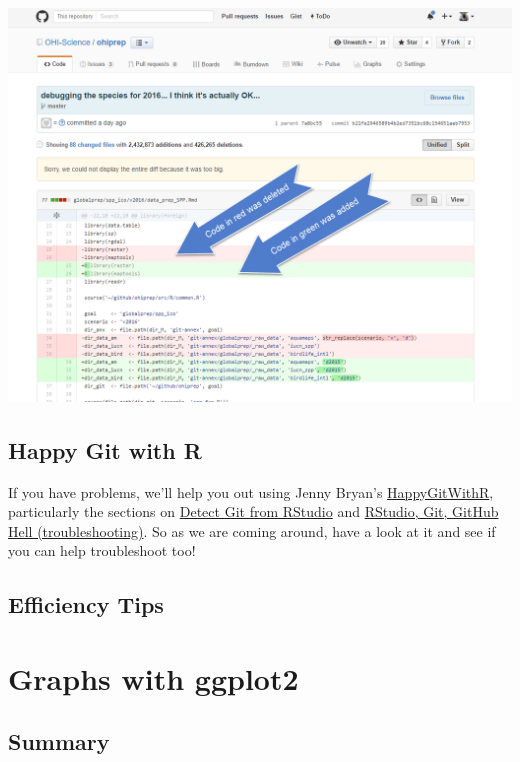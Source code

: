 \documentclass[]{book}
\begin{document}
\includegraphics{img/commit_compare_3.png}

\hypertarget{happy-git-with-r}{%
\section{Happy Git with R}\label{happy-git-with-r}}

If you have problems, we'll help you out using Jenny Bryan's \href{http://happygitwithr.com}{HappyGitWithR}, particularly the sections on \href{http://happygitwithr.com/rstudio-see-git.html}{Detect Git from RStudio} and \href{http://happygitwithr.com/troubleshooting.html}{RStudio, Git, GitHub Hell (troubleshooting)}. So as we are coming around, have a look at it and see if you can help troubleshoot too!

\hypertarget{efficiency-tips-1}{%
\section{Efficiency Tips}\label{efficiency-tips-1}}

\hypertarget{ggplot2}{%
\chapter{Graphs with ggplot2}\label{ggplot2}}

\hypertarget{summary-2}{%
\section{Summary}\label{summary-2}}
\end{document}
